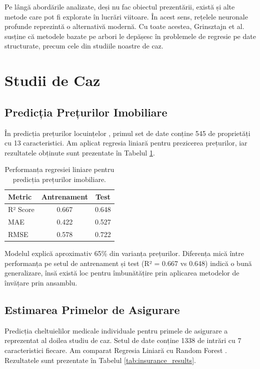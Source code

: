 \documentclass[a4paper,12pt]{article}
\begin{document}
Pe lângă abordările analizate, deși nu fac obiectul prezentării, există și alte metode care pot fi explorate în lucrări viitoare. În acest sens, rețelele neuronale profunde reprezintă o alternativă modernă. Cu toate acestea, Grinsztajn et al. \cite{grinsztajn2022tree} susține că metodele bazate pe arbori le depășesc în problemele de regresie pe date structurate, precum cele din studiile noastre de caz.

\section{Studii de Caz \cite{github_repo}}

\subsection{Predicția Prețurilor Imobiliare}
\label{sec:house}

În predicția prețurilor locuințelor \cite{house_prices_kaggle}, primul set de date conține 545 de proprietăți cu 13 caracteristici. Am aplicat regresia liniară pentru prezicerea prețurilor, iar rezultatele obținute sunt prezentate în Tabelul \ref{tab:house_results}.

\begin{table}[H]
\centering
\begin{tabular}{lcc}
\toprule
\textbf{Metric} & \textbf{Antrenament} & \textbf{Test} \\
\midrule
R² Score & 0.667 & 0.648 \\
MAE & 0.422 & 0.527 \\
RMSE & 0.578 & 0.722 \\
\bottomrule
\end{tabular}
\caption{Performanța regresiei liniare pentru predicția prețurilor imobiliare.}
\label{tab:house_results}
\end{table}

Modelul explică aproximativ 65\% din varianța prețurilor. Diferența mică între performanța pe setul de antrenament și test (R² = 0.667 vs 0.648) indică o bună generalizare, însă există loc pentru îmbunătățire prin aplicarea metodelor de învățare prin ansamblu.

\subsection{Estimarea Primelor de Asigurare}
\label{sec:insurance}

Predicția cheltuielilor medicale individuale \cite{insurance_dataset} pentru primele de asigurare a reprezentat al doilea studiu de caz. Setul de date conține 1338 de intrări cu 7 caracteristici fiecare. Am comparat Regresia Liniară cu Random Forest \cite{breiman2001random}. Rezultatele sunt prezentate în Tabelul \ref{tab:insurance_results}.
\end{document}
